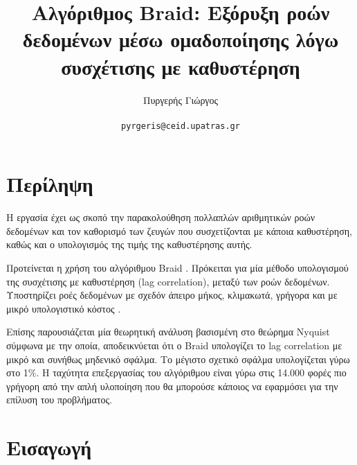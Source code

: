 \documentclass[a4paper,12pt]{article}
\title{
Αλγόριθμος \textlatin{Braid}: Εξόρυξη ροών δεδομένων μέσω ομαδοποίησης λόγω συσχέτισης με καθυστέρηση
}
\author{Πυργερής Γιώργος\\
\begin{small}\textlatin{\texttt{pyrgeris@ceid.upatras.gr}}\end{small}}
\begin{document}
\maketitle

\section*{Περίληψη}

\par Η εργασία έχει ως σκοπό την παρακολούθηση πολλαπλών αριθμητικών ροών δεδομένων και τον καθορισμό των ζευγών που συσχετίζονται με κάποια καθυστέρηση, καθώς και ο υπολογισμός της τιμής της καθυστέρησης αυτής.
\par Προτείνεται η χρήση του αλγόριθμου \textlatin{Braid} . Πρόκειται για μία μέθοδο υπολογισμού της συσχέτισης με καθυστέρηση (\textlatin{lag correlation}), μεταξύ των ροών δεδομένων. Υποστηρίζει ροές δεδομένων με σχεδόν άπειρο μήκος, 
κλιμακωτά, γρήγορα και με μικρό υπολογιστικό κόστος .
\par Επίσης παρουσιάζεται μία θεωρητική ανάλυση βασισμένη στο θεώρημα \textlatin{Nyquist} σύμφωνα με την οποία, αποδεικνύεται ότι ο \textlatin{Braid}
υπολογίζει το \textlatin{lag correlation} με μικρό και συνήθως μηδενικό σφάλμα.
Το μέγιστο σχετικό σφάλμα υπολογίζεται γύρω στο 1\%. Η ταχύτητα επεξεργασίας του αλγόριθμου είναι γύρω στις 14.000 φορές πιο γρήγορη από την απλή υλοποίηση που θα μπορούσε κάποιος να εφαρμόσει για την επίλυση του προβλήματος.

\section*{Εισαγωγή}
\end{document}

